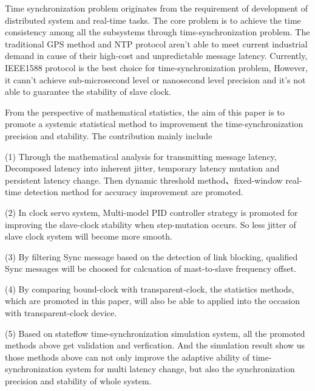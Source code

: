 \begin{englishabstract}

Time synchronization problem originates from the requirement of development of distributed system and real-time tasks. The core problem is to achieve the time consistency among all the subsystems through tims-synchronization problem. The traditional GPS method and NTP protocol aren't able to meet current industrial demand in cause of their high-cost and unpredictable message latency. Currently, IEEE1588 protocol is the best choice for time-synchronization problem, However, it cann't achieve sub-microsecond level or nanosecond level precision and it's not able to guarantee the stability of slave clock.

From the perspective of mathematical statistics, the aim of this paper is to promote a systemic statistical method to improvement the time-synchronization precision and stability. The contribution mainly include

(1) Through the mathematical analysis for transmitting message latency, Decomposed latency into inherent jitter, temporary latency mutation and persistent latency change. Then dynamic threshold method、fixed-window real-time detection method for accuracy improvement are promoted.

(2) In clock servo system, Multi-model PID controller strategy is promoted for improving the slave-clock stability when step-mutation occurs. So less jitter of slave clock system will become more smooth.

(3) By filtering Sync message based on the detection of link blocking, qualified Sync messages will be choosed for calcuation of mast-to-slave frequency offset.

(4) By comparing bound-clock with transparent-clock, the statistics methods, which are promoted in this paper, will also be able to applied into the occasion with transparent-clock device.

(5) Based on stateflow time-synchronization simulation system, all the promoted methods above get validation and verfication. And the simulation result show us those methods above can not only improve the adaptive ability of time-synchronization system for multi latency change, but also the synchronization precision and stability of whole system.

\end{englishabstract}

